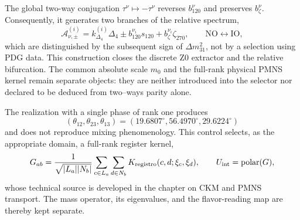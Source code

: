 The global two-way conjugation
\(\tau^\nu\mapsto-\tau^\nu\) reverses
\(b_{120}^\nu\) and preserves \(b_\zeta^\nu\). Consequently, it generates two
branches of the relative spectrum,
\begin{equation}
 \mathcal A_{\nu,\pm}^{(i)}
 =k_{\Delta_4}^{(i)}\Delta_4
  \pm b_{120}^{\nu_i}s_{120}
  +b_\zeta^{\nu_i}\zeta_{270},
 \qquad
 \text{NO}\longleftrightarrow\text{IO},
 \label{eq:bifurcacion-neutra-no-io-rev2}
\end{equation}
which are distinguished by the subsequent sign of \(\Delta m_{31}^2\), not by a selection using PDG data. This construction closes the discrete Z0 extractor and the relative bifurcation. The common absolute scale \(m_0\) and the full-rank physical PMNS kernel remain separate objects: they are neither introduced into the selector nor declared to be deduced from two--ways parity alone.

The realization with a single phase of rank one produces
\[
 (\theta_{12},\theta_{23},\theta_{13})
 =(19.6807^\circ,56.4970^\circ,29.6224^\circ)
\]
and does not reproduce mixing phenomenology. This control selects, as the appropriate domain, a
full-rank register kernel,
\begin{equation}
 G_{ab}=\frac1{\sqrt{|L_a||N_b|}}
 \sum_{c\in L_a}\sum_{d\in N_b}
 K_{\rm registro}(c,d;\xi_c,\xi_d),
 \qquad U_{\rm int}=\operatorname{polar}(G),
 \label{eq:kernel-registro-rango-completo-rev2}
\end{equation}
whose technical source is developed in the chapter on CKM and PMNS
transport. The mass operator, its eigenvalues, and the flavor-reading map
are thereby kept separate.
